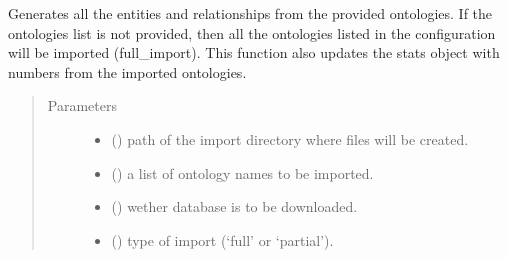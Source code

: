\documentclass[letterpaper,10pt,english]{sphinxmanual}
\begin{document}
\begin{fulllineitems}
\label{\detokenize{_autosummary/graphdb_builder.builder:graphdb_builder.builder.importer.ontologiesImport}}
Generates all the entities and relationships from the provided ontologies. If the ontologies list is    not provided, then all the ontologies listed in the configuration will be imported (full\_import).     This function also updates the stats object with numbers from the imported ontologies.
\begin{quote}\begin{description}
\item[{Parameters}] \leavevmode\begin{itemize}
\item {} 
 () \textendash{} path of the import directory where files will be created.

\item {} 
 () \textendash{} a list of ontology names to be imported.

\item {} 
 () \textendash{} wether database is to be downloaded.

\item {} 
 () \textendash{} type of import (‘full’ or ‘partial’).

\end{itemize}

\end{description}\end{quote}

\end{fulllineitems}
\end{document}
